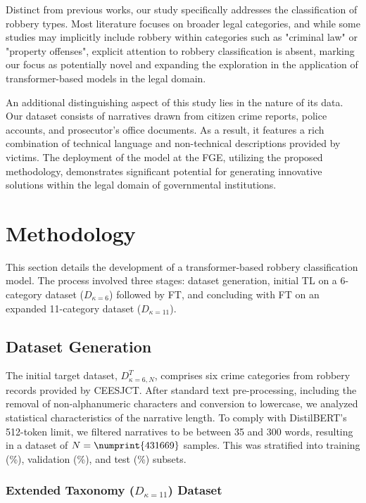 \documentclass[runningheads]{llncs}
\newcommand{\printInicialesComision}{CEESJCT}
\begin{document}
Distinct from previous works, our study specifically addresses the
classification of robbery types.  Most literature focuses on broader
legal categories, and while some studies may implicitly include
robbery within categories such as "criminal law" or "property
offenses", explicit attention to robbery classification is absent,
marking our focus as potentially novel and expanding the exploration
in the application of transformer-based models in the legal domain.

An additional distinguishing aspect of this study lies in the nature
of its data. Our dataset consists of narratives drawn from citizen
crime reports, police accounts, and prosecutor's office documents. As
a result, it features a rich combination of technical language and
non-technical descriptions provided by victims. The deployment of the
model at the FGE, utilizing the proposed methodology, demonstrates
significant potential for generating innovative solutions within the
legal domain of governmental institutions.


\section{Methodology}
\label{sec:methods}
This section details the development of a transformer-based robbery
classification model. The process involved three stages: dataset
generation, initial TL on a 6-category dataset (\(D_{\kappa=6}\))
followed by FT, and concluding with FT on an expanded 11-category
dataset (\(D_{\kappa=11}\)).

\subsection{Dataset Generation}
\label{sec:dataset-generation}

The initial target dataset, \(D^T_{\kappa=6, N}\), comprises six crime
categories from  robbery records provided by
\printInicialesComision{}. After standard text pre-processing,
including the removal of non-alphanumeric characters and conversion to
lowercase, we analyzed statistical characteristics of the narrative
length. To comply with DistilBERT’s\cite{Sanh2019DistilBERTAD}
512-token limit, we filtered narratives to be between 35 and 300
words, resulting in a dataset of \(N = \numprint{431669}\)
samples. This was stratified into training (\%),
validation (\%), and test (\%)
subsets.


\subsubsection{Extended Taxonomy (\(D_{\kappa=11}\)) Dataset}
\label{sec:extended-dataset}
\end{document}
